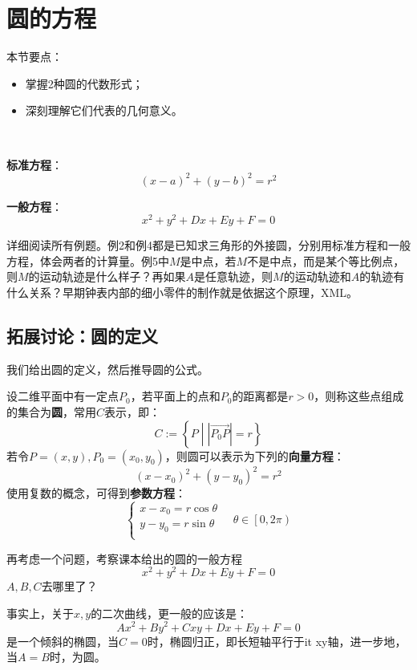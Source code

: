 \section{圆的方程}

本节要点：
\begin{itemize}
    \item 掌握2种圆的代数形式；
    \item 深刻理解它们代表的几何意义。
\end{itemize}

~

{\bf 标准方程}：
\[
\left( x-a \right) ^2+\left( y-b \right) ^2=r^2
\]

{\bf 一般方程}：
\[
x^2+y^2+Dx+Ey+F=0
\]

\begin{tcolorbox}
详细阅读所有例题。例2和例4都是已知求三角形的外接圆，分别用标准方程和一般方程，体会两者的计算量。例5中$M$是中点，若$M$不是中点，而是某个等比例点，则$M$的运动轨迹是什么样子？再如果$A$是任意轨迹，则$M$的运动轨迹和$A$的轨迹有什么关系？早期钟表内部的细小零件的制作就是依据这个原理，XML。
\end{tcolorbox}

\subsection{拓展讨论：圆的定义}

我们给出圆的定义，然后推导圆的公式。

\begin{definition}[圆]
设二维平面中有一定点$P_0$，若平面上的点和$P_0$的距离都是$r>0$，则称这些点组成的集合为{\bf 圆}，常用$C$表示，即：
\[
C:=\left\{ P \middle| \left| \overrightarrow{P_0P} \right|=r \right\}
\]
若令$P=\left( x,y \right) ,P_0=\left( x_0,y_0 \right) $，则圆可以表示为下列的{\bf 向量方程}：
\[
\left( x-x_0 \right) ^2+\left( y-y_0 \right) ^2=r^2
\]
使用复数的概念，可得到{\bf 参数方程}：
\[
\begin{cases}
	x-x_0=r\cos \theta\\
	y-y_0=r\sin \theta\\
\end{cases} \quad \theta \in \left[ 0,2\pi \right)
\]
\end{definition}

再考虑一个问题，考察课本给出的圆的一般方程
\[
x^2+y^2+Dx+Ey+F=0
\]
$A,B,C$去哪里了？

事实上，关于$x,y$的二次曲线，更一般的应该是：
\[
Ax^2+By^2+Cxy+Dx+Ey+F=0
\]
是一个倾斜的椭圆，当$C=0$时，椭圆归正，即长短轴平行于{it xy}轴，进一步地，当$A=B$时，为圆。


